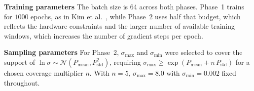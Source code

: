 \textbf{Training parameters} \quad The batch size is 64 across both phases. Phase~1 trains for \(1000\) epochs, as in Kim et al.\ \cite{kim2025diffusion}, while Phase~2 uses half that budget, which reflects the hardware constraints and the larger number of available training windows, which increases the number of gradient steps per epoch.

\textbf{Sampling parameters} \quad For Phase~2, $\sigma_{\max}$ and $\sigma_{\min}$ were
selected to cover the support of $\ln\sigma \sim \mathcal{N}(P_{\text{mean}}, P_{\text{std}}^2)$,
requiring $\sigma_{\max} \geq \exp(P_{\text{mean}} + n\,P_{\text{std}})$ for a chosen
coverage multiplier $n$. With \(n=5\), \(\sigma_{\max}=8.0\) with $\sigma_{\min} = 0.002$ fixed throughout.
\newpage
